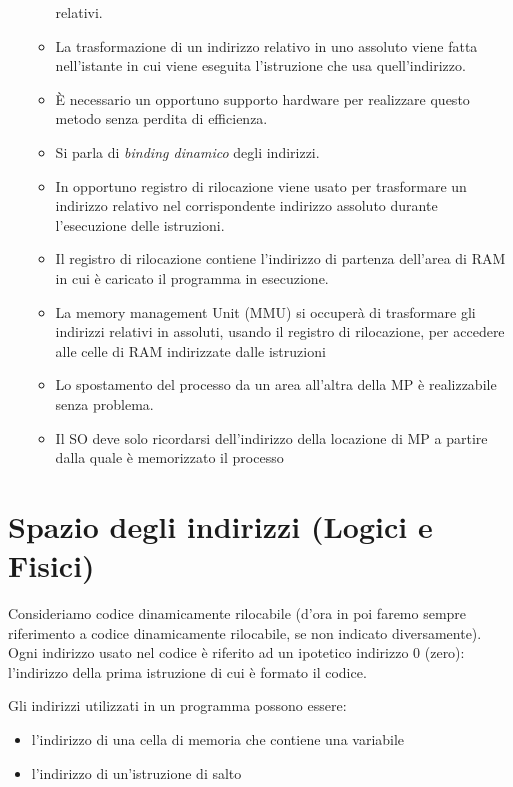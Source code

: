 \begin{enumerate}
\begin{itemize}
            relativi.
            \item La trasformazione di un indirizzo relativo in uno
            assoluto viene fatta nell'istante in cui viene eseguita
            l'istruzione che usa quell'indirizzo.
            \item È necessario un opportuno supporto hardware per realizzare
            questo metodo senza perdita di efficienza.
            \item Si parla di \textit{binding dinamico} degli indirizzi.
            \item In opportuno registro di rilocazione viene usato per trasformare un indirizzo relativo nel corrispondente indirizzo assoluto durante l’esecuzione delle istruzioni.
            \item Il registro di rilocazione contiene l’indirizzo di partenza dell’area di RAM in cui è caricato il programma in esecuzione.
            \item La memory management Unit (MMU) si occuperà di trasformare gli indirizzi relativi in assoluti, usando il registro di rilocazione, per accedere alle celle di RAM indirizzate dalle istruzioni
            \item Lo spostamento del processo da un area all’altra della MP è realizzabile senza problema.
            \item Il SO deve solo ricordarsi dell’indirizzo della locazione di MP a partire dalla quale è memorizzato il processo
        \end{itemize}
\end{enumerate}

\section{Spazio degli indirizzi (Logici e Fisici)}
Consideriamo codice dinamicamente rilocabile (d’ora in poi faremo sempre riferimento a codice dinamicamente rilocabile, se non indicato diversamente). Ogni indirizzo usato nel codice è riferito ad un ipotetico indirizzo 0 (zero): l’indirizzo della prima istruzione di cui è formato il codice.

Gli indirizzi utilizzati in un programma possono essere:
\begin{itemize}
    \item l'indirizzo di una cella di memoria che contiene una variabile
    \item l'indirizzo di un'istruzione di salto
\end{itemize}

